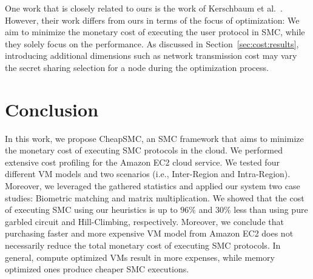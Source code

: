 \documentclass{llncs}
\newcommand{\sysname}{{CheapSMC}\xspace}
\begin{document}
One work that is closely related to ours is the work of Kerschbaum et al.~\cite{cite:kerschbaum2014automatic}. However, their work differs from ours in terms of the focus of optimization: We aim to minimize the monetary cost of executing the user protocol in SMC, while they solely focus on the performance. As discussed in Section~\ref{sec:cost:results}, introducing additional dimensions such as network transmission cost may vary the secret sharing selection for a node during the optimization process.

\vspace{-0.4cm}
\section{Conclusion}
\label{sec:conclusion}

In this work, we propose \sysname, an SMC framework that aims to minimize the monetary cost of executing SMC protocols in the cloud. We performed extensive cost profiling for the Amazon EC2 cloud service. We tested four different VM models and two scenarios (i.e., Inter-Region and Intra-Region). Moreover, we leveraged the gathered statistics and applied our system  two case studies: Biometric matching and matrix multiplication. We showed that the cost of executing SMC using our heuristics is up to $96\%$ and $30\%$ less than using pure garbled circuit and Hill-Climbing, respectively. Moreover, we conclude that purchasing faster and more expensive VM model from Amazon EC2 does not necessarily reduce the total monetary cost of executing SMC protocols. In general, compute optimized VMs result in more expenses, while memory optimized ones produce cheaper SMC executions.



\end{document}
